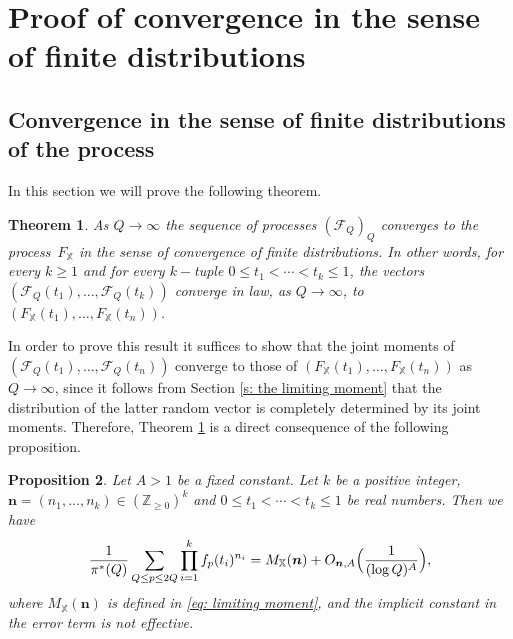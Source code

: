 \documentclass[JEP,XML,SOM,Unicode,NoFloatCountersInSection,published]{cedram}
\theoremstyle{plain}
\newtheorem{thm}{Theorem}[section]
\newtheorem{pro}[thm]{Proposition}
\theoremstyle{definition}
\newcommand{\X}{\mathbb{X}}
\begin{document}
\section{Proof of convergence in the sense of finite distributions}\label{s: proof of convergence in finite distributions real}

\subsection{Convergence in the sense of finite distributions of the process} In this section we will prove the following theorem.
\begin{thm}\label{thm: convergence in finite distribution}
As $Q\to \infty$ the sequence of processes $(\mathcal{F}_{Q})_Q$ converges to the process~$F_{\X}$ in the sense of convergence of finite distributions.
In other words, for every $k \geq 1$ and for every $k-$tuple $0 \leq t_1 < \cdots < t_k \leq 1$, the vectors
$ (\mathcal{F}_{Q}(t_1), \dots, \mathcal{F}_{Q}(t_k))
$
converge in law, as $Q \rightarrow \infty$, to
$(F_{\X}(t_1), \dots, F_{\X}(t_n))$.
\end{thm}

In order to prove this result it suffices to show that the joint moments of $(\mathcal{F}_{Q}(t_1), \dots, \mathcal{F}_{Q}(t_n))$ converge to those of $(F_{\X}(t_1), \dots, F_{\X}(t_n))$ as $Q\to \infty$, since it follows from Section \ref{s: the limiting moment} that the distribution of the latter random vector is completely determined by its joint moments. Therefore, Theorem \ref{thm: convergence in finite distribution} is a direct consequence of the following proposition.

\begin{pro}\label{thm: moments theorem}
Let $A>1$ be a fixed constant. Let $k$ be a positive integer, $\boldsymbol{n} = (n_1, \dots, n_k)\in (\mathbb{Z}_{\geq 0})^k$ and $0 \leq t_1 < \cdots < t_k \leq 1$ be real numbers. Then we have
\begin{equation}\label{AsymptoticMomentsMQ}
\frac{1}{\pi^*(Q)} \sum_{Q\leq p \leq 2Q} \prod_{i =1}^k f_{p}(t_i)^{n_i}= M_{\X}(\boldsymbol{n}) + O_{\boldsymbol{n}, A}\Bigl(\frac{1}{(\log Q)^{A}}\Bigr),
\end{equation}
where $M_{\X}(\boldsymbol{n})$ is defined in \eqref{eq: limiting moment}, and the implicit constant in the error term is not effective.
\end{pro}
\end{document}
